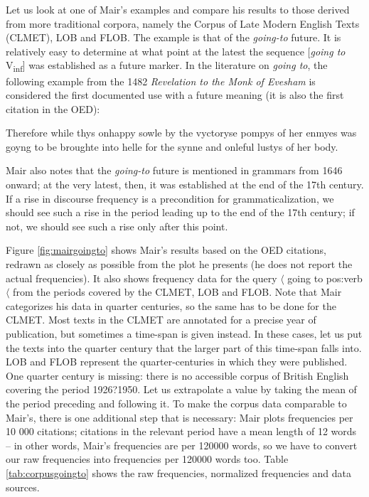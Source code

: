 Let us look at one of Mair's examples and compare his results to those derived from more traditional corpora, namely the Corpus of Late Modern English Texts (CLMET), LOB and FLOB. The example is that of the \textit{going-to} future. It is relatively easy to determine at what point at the latest the sequence [\textit{going to} V\textsubscript{inf}] was established as a future marker. In the literature on \textit{going to}, the following example from the 1482 \textit{Revelation to the Monk of Evesham} is considered the first documented use with a future meaning (it is also the first citation in the OED):

\begin{exe}
\ex Therefore while thys onhappy sowle by the vyctoryse pompys of her enmyes was goyng to be broughte into helle for the synne and onleful lustys of her body.
\label{ex:firstgoingtofuture}
\end{exe}

Mair also notes that the \textit{going-to} future is mentioned in grammars from 1646 onward; at the very latest, then, it was established at the end of the 17th century. If a rise in discourse frequency is a precondition for grammaticalization, we should see such a rise in the period leading up to the end of the 17th century; if not, we should see such a rise only after this point.

Figure \ref{fig:mairgoingto} shows Mair's results based on the OED citations, redrawn as closely as possible from the plot he presents (he does not report the actual frequencies). It also shows frequency data for the query $\langle$ going to pos:verb $\langle$ from the periods covered by the CLMET, LOB and FLOB. Note that Mair categorizes his data in quarter centuries, so the same has to be done for the CLMET. Most texts in the CLMET are annotated for a precise year of publication, but sometimes a time-span is given instead. In these cases, let us put the texts into the quarter century that the larger part of this time-span falls into. LOB and FLOB represent the quarter-centuries in which they were published. One quarter century is missing: there is no accessible corpus of British English covering the period 1926?1950. Let us extrapolate a value by taking the mean of the period preceding and following it. To make the corpus data comparable to Mair's, there is one additional step that is necessary: Mair plots frequencies per 10 000 citations; citations in the relevant period have a mean length of 12 words \citep[see][25]{hoffmann_using_2004} -- in other words, Mair's frequencies are per \num{120000} words, so we have to convert our raw frequencies into frequencies per \num{120000} words too. Table \ref{tab:corpusgoingto} shows the raw frequencies, normalized frequencies and data sources.

